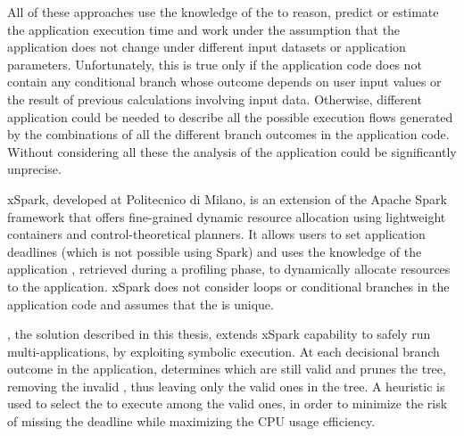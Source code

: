 All of these approaches use the knowledge of the \plan to reason, predict or estimate the application execution time and work under the assumption that the application \plan does not change under different input datasets or application parameters. Unfortunately, this is true only if the application code does not contain any conditional branch whose outcome depends on user input values or the result of previous calculations involving input data. %
Otherwise, different application \plans could be needed to describe all the possible execution flows generated by the combinations of all the different branch outcomes in the application code. Without considering all these \plans the analysis of the application could be significantly unprecise.


xSpark, developed at Politecnico di Milano, is an extension of the Apache Spark framework that offers fine-grained dynamic resource allocation using lightweight containers and control-theoretical planners. It allows users to set application deadlines (which is not possible using Spark) and uses the knowledge of the application \plan, retrieved during a profiling phase, to dynamically allocate resources to the application.
xSpark does not consider loops or conditional branches in the application code and assumes that the \plan is unique.

\tool, the solution described in this thesis, extends xSpark capability to safely run multi-\plan applications, by exploiting symbolic execution. At each decisional branch outcome in the application, \tool determines which \plans are still valid and prunes the \plans tree, removing the invalid \plans, thus leaving only the valid ones in the \plans tree. A heuristic is used to select the \plan to execute among the valid ones, in order to minimize the risk of missing the deadline while maximizing the CPU usage efficiency.


